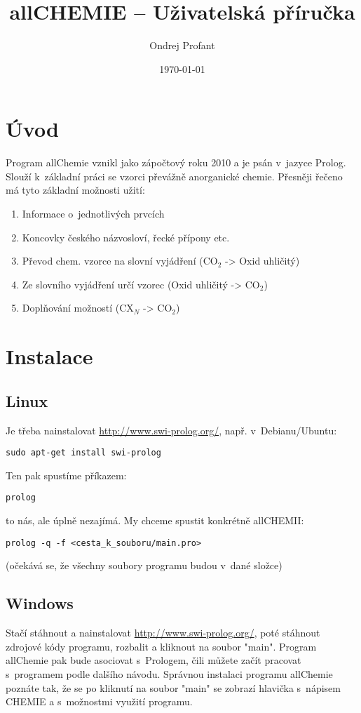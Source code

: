 \documentclass[a4paper]{article}
\title{allCHEMIE -- Uživatelská příručka}
\author{Ondrej Profant}
\date{\today}
\begin{document}
\maketitle
\newpage
\tableofcontents
\newpage
\section{Úvod}
Program allChemie vznikl jako zápočtový roku 2010 a je psán v~jazyce Prolog. Slouží k~základní práci se vzorci převážně anorganické chemie. Přesněji řečeno má tyto základní možnosti užití:
\begin{enumerate}
\item Informace o~jednotlivých prvcích
\item Koncovky českého názvosloví, řecké přípony etc.
\item Převod chem. vzorce na slovní vyjádření (CO$_2$ -> Oxid uhličitý)
\item Ze slovního vyjádření určí vzorec (Oxid uhličitý -> CO$_2$)
\item Doplňování možností (CX$_N$ -> CO$_2$)

\end{enumerate}
\section{Instalace} 
\subsection{Linux}
Je třeba nainstalovat \href{swi-prolog}{http://www.swi-prolog.org/}, např. v~Debianu/Ubuntu:
\begin{verbatim}
sudo apt-get install swi-prolog
\end{verbatim}
Ten pak spustíme příkazem:

\begin{verbatim}
prolog
\end{verbatim}

to nás, ale úplně nezajímá. My chceme spustit konkrétně allCHEMII:
\begin{verbatim}
prolog -q -f <cesta_k_souboru/main.pro>
\end{verbatim}
(očekává se, že všechny soubory programu budou v~dané složce)
\subsection{Windows}
Stačí stáhnout a nainstalovat \href{swi-prolog}{http://www.swi-prolog.org/}, poté stáhnout zdrojové kódy programu, rozbalit a kliknout na soubor "main". Program allChemie pak bude asociovat s~Prologem, čili můžete začít pracovat s~programem podle dalšího návodu. Správnou instalaci programu allChemie poznáte tak, že se po kliknutí na soubor "main" se zobrazí hlavička s~nápisem CHEMIE a s~možnostmi využití programu.
\end{document}
